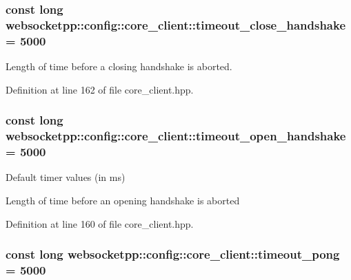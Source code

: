 \subsubsection[{timeout\+\_\+close\+\_\+handshake}]{\setlength{\rightskip}{0pt plus 5cm}const long websocketpp\+::config\+::core\+\_\+client\+::timeout\+\_\+close\+\_\+handshake = 5000\hspace{0.3cm}{\ttfamily [static]}}\label{structwebsocketpp_1_1config_1_1core__client_aa9c3092633bdd220e4a8d9f9ce1581ef}


Length of time before a closing handshake is aborted. 



Definition at line 162 of file core\+\_\+client.\+hpp.

\hypertarget{structwebsocketpp_1_1config_1_1core__client_aad4057440517a8586c2dfebdbca0936c}{}
\subsubsection[{timeout\+\_\+open\+\_\+handshake}]{\setlength{\rightskip}{0pt plus 5cm}const long websocketpp\+::config\+::core\+\_\+client\+::timeout\+\_\+open\+\_\+handshake = 5000\hspace{0.3cm}{\ttfamily [static]}}\label{structwebsocketpp_1_1config_1_1core__client_aad4057440517a8586c2dfebdbca0936c}


Default timer values (in ms) 

Length of time before an opening handshake is aborted 

Definition at line 160 of file core\+\_\+client.\+hpp.

\hypertarget{structwebsocketpp_1_1config_1_1core__client_aecd2b27b526691e483d986711f655065}{}
\subsubsection[{timeout\+\_\+pong}]{\setlength{\rightskip}{0pt plus 5cm}const long websocketpp\+::config\+::core\+\_\+client\+::timeout\+\_\+pong = 5000\hspace{0.3cm}{\ttfamily [static]}}\label{structwebsocketpp_1_1config_1_1core__client_aecd2b27b526691e483d986711f655065}



